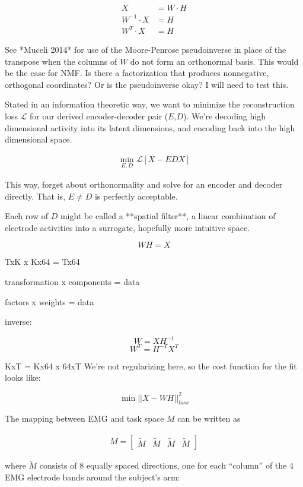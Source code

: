 \documentclass[../main.tex]{subfiles}
\begin{document}
\begin{align*}
X &= W\cdot{H} \\
W^{-1}\cdot{X} &= {H} \\
W^{T}\cdot{X} &= {H}
\end{align*}

See *Muceli 2014* for use of the Moore-Penrose pseudoinverse in place of the transpose when the columns of $W$ do not form an orthonormal basis. This would be the case for NMF. Is there a factorization that produces nonnegative, orthogonal coordinates? Or is the pseudoinverse okay? I will need to test this.

Stated in an information theoretic way, we want to minimize the reconstruction loss $\mathcal{L}$ for our derived encoder-decoder pair ($E$,$D$). We're decoding high dimensional activity into its latent dimensions, and encoding back into the high dimensional space.

\begin{align}
  \min_{E,D}{\mathcal{L}\left[X - EDX\right]}
\end{align}

This way, forget about orthonormality and solve for an encoder and decoder directly. That is, $E\neq{D}$ is perfectly acceptable.

Each row of $D$ might be called a **spatial filter**, a linear combination of electrode activities into a surrogate, hopefully more intuitive space.


$$WH   =  X$$

TxK x Kx64 = Tx64

transformation x components = data

factors x weights = data

inverse:

$$W = XH^{-1}$$
$$W^T = H^{-T}X^T$$

KxT = Kx64 x 64xT
We're not regularizing here, so the cost function for the fit looks like:

$$\min{||X - WH||^{2}_{loss}}$$


The mapping between EMG and task space $M$ can be written as

\begin{align}
M = \begin{bmatrix}\tilde{M} & \tilde{M} & \tilde{M} & \tilde{M}\end{bmatrix}
\end{align}

where $\tilde{M}$ consists of 8 equally spaced directions, one for
each ``column'' of the 4 EMG electrode bands around the subject's arm:
\end{document}
